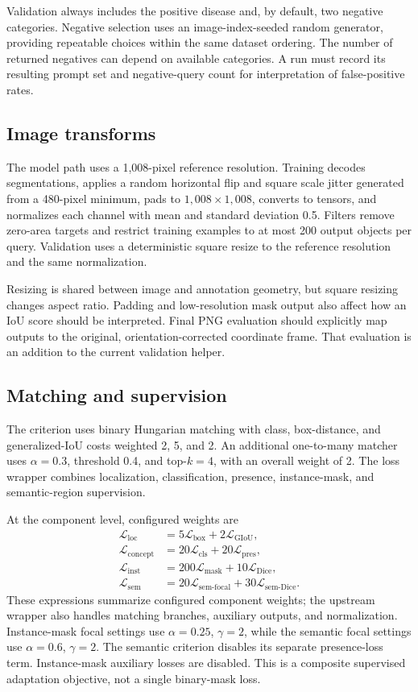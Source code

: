 Validation always includes the positive disease and, by default, two negative categories. Negative selection uses an image-index-seeded random generator, providing repeatable choices within the same dataset ordering. The number of returned negatives can depend on available categories. A run must record its resulting prompt set and negative-query count for interpretation of false-positive rates.

\subsection{Image transforms}
The model path uses a 1,008-pixel reference resolution. Training decodes segmentations, applies a random horizontal flip and square scale jitter generated from a 480-pixel minimum, pads to $1{,}008\times1{,}008$, converts to tensors, and normalizes each channel with mean and standard deviation 0.5. Filters remove zero-area targets and restrict training examples to at most 200 output objects per query. Validation uses a deterministic square resize to the reference resolution and the same normalization.

Resizing is shared between image and annotation geometry, but square resizing changes aspect ratio. Padding and low-resolution mask output also affect how an IoU score should be interpreted. Final PNG evaluation should explicitly map outputs to the original, orientation-corrected coordinate frame. That evaluation is an addition to the current validation helper.

\subsection{Matching and supervision}
The criterion uses binary Hungarian matching with class, box-distance, and generalized-IoU costs weighted 2, 5, and 2. An additional one-to-many matcher uses $\alpha=0.3$, threshold 0.4, and top-$k=4$, with an overall weight of 2. The loss wrapper combines localization, classification, presence, instance-mask, and semantic-region supervision.

At the component level, configured weights are
\begin{align}
\mathcal L_{\mathrm{loc}} &=5\mathcal L_{\mathrm{box}}+2\mathcal L_{\mathrm{GIoU}},\\
\mathcal L_{\mathrm{concept}} &=20\mathcal L_{\mathrm{cls}}+20\mathcal L_{\mathrm{pres}},\\
\mathcal L_{\mathrm{inst}} &=200\mathcal L_{\mathrm{mask}}+10\mathcal L_{\mathrm{Dice}},\\
\mathcal L_{\mathrm{sem}} &=20\mathcal L_{\mathrm{sem\mbox{-}focal}}
                         +30\mathcal L_{\mathrm{sem\mbox{-}Dice}}.
\end{align}
These expressions summarize configured component weights; the upstream wrapper also handles matching branches, auxiliary outputs, and normalization. Instance-mask focal settings use $\alpha=0.25$, $\gamma=2$, while the semantic focal settings use $\alpha=0.6$, $\gamma=2$. The semantic criterion disables its separate presence-loss term. Instance-mask auxiliary losses are disabled. This is a composite supervised adaptation objective, not a single binary-mask loss.

